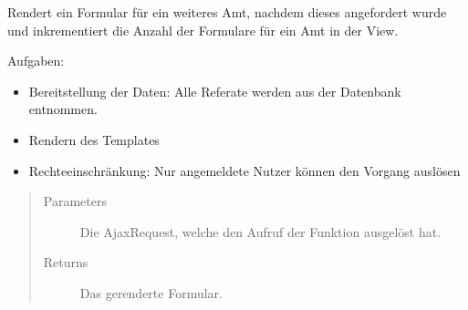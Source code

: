 \documentclass[letterpaper,10pt,english]{sphinxmanual}
\begin{document}
\begin{fulllineitems}
\label{\detokenize{masterCodeDoc:mitglieder.views.funktionen_html_laden}}
Rendert ein Formular für ein weiteres Amt, nachdem dieses angefordert wurde und inkrementiert die Anzahl der Formulare für ein Amt in der View.

Aufgaben:
\begin{itemize}
\item {} 
Bereitstellung der Daten: Alle Referate werden aus der Datenbank entnommen.

\item {} 
Rendern des Templates

\item {} 
Rechteeinschränkung: Nur angemeldete Nutzer können den Vorgang auslösen

\end{itemize}
\begin{quote}\begin{description}
\item[{Parameters}] \leavevmode
{} \textendash{} Die Ajax\sphinxhyphen{}Request, welche den Aufruf der Funktion ausgelöst hat.

\item[{Returns}] \leavevmode
Das gerenderte Formular.

\end{description}\end{quote}

\end{fulllineitems}

\end{document}
